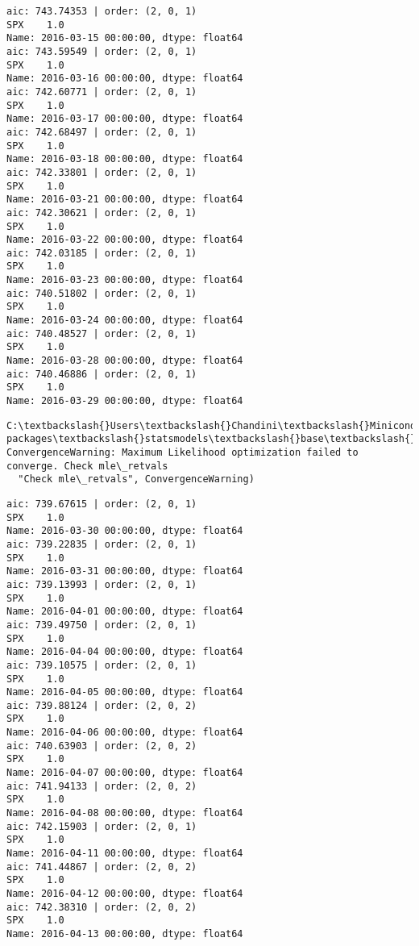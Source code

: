 \documentclass[11pt]{article}
\begin{document}
    \begin{Verbatim}[commandchars=\\\{\}]
aic: 743.74353 | order: (2, 0, 1)
SPX    1.0
Name: 2016-03-15 00:00:00, dtype: float64
aic: 743.59549 | order: (2, 0, 1)
SPX    1.0
Name: 2016-03-16 00:00:00, dtype: float64
aic: 742.60771 | order: (2, 0, 1)
SPX    1.0
Name: 2016-03-17 00:00:00, dtype: float64
aic: 742.68497 | order: (2, 0, 1)
SPX    1.0
Name: 2016-03-18 00:00:00, dtype: float64
aic: 742.33801 | order: (2, 0, 1)
SPX    1.0
Name: 2016-03-21 00:00:00, dtype: float64
aic: 742.30621 | order: (2, 0, 1)
SPX    1.0
Name: 2016-03-22 00:00:00, dtype: float64
aic: 742.03185 | order: (2, 0, 1)
SPX    1.0
Name: 2016-03-23 00:00:00, dtype: float64
aic: 740.51802 | order: (2, 0, 1)
SPX    1.0
Name: 2016-03-24 00:00:00, dtype: float64
aic: 740.48527 | order: (2, 0, 1)
SPX    1.0
Name: 2016-03-28 00:00:00, dtype: float64
aic: 740.46886 | order: (2, 0, 1)
SPX    1.0
Name: 2016-03-29 00:00:00, dtype: float64

    \end{Verbatim}

    \begin{Verbatim}[commandchars=\\\{\}]
C:\textbackslash{}Users\textbackslash{}Chandini\textbackslash{}Miniconda3\textbackslash{}envs\textbackslash{}auquan\textbackslash{}lib\textbackslash{}site-packages\textbackslash{}statsmodels\textbackslash{}base\textbackslash{}model.py:496: ConvergenceWarning: Maximum Likelihood optimization failed to converge. Check mle\_retvals
  "Check mle\_retvals", ConvergenceWarning)

    \end{Verbatim}

    \begin{Verbatim}[commandchars=\\\{\}]
aic: 739.67615 | order: (2, 0, 1)
SPX    1.0
Name: 2016-03-30 00:00:00, dtype: float64
aic: 739.22835 | order: (2, 0, 1)
SPX    1.0
Name: 2016-03-31 00:00:00, dtype: float64
aic: 739.13993 | order: (2, 0, 1)
SPX    1.0
Name: 2016-04-01 00:00:00, dtype: float64
aic: 739.49750 | order: (2, 0, 1)
SPX    1.0
Name: 2016-04-04 00:00:00, dtype: float64
aic: 739.10575 | order: (2, 0, 1)
SPX    1.0
Name: 2016-04-05 00:00:00, dtype: float64
aic: 739.88124 | order: (2, 0, 2)
SPX    1.0
Name: 2016-04-06 00:00:00, dtype: float64
aic: 740.63903 | order: (2, 0, 2)
SPX    1.0
Name: 2016-04-07 00:00:00, dtype: float64
aic: 741.94133 | order: (2, 0, 2)
SPX    1.0
Name: 2016-04-08 00:00:00, dtype: float64
aic: 742.15903 | order: (2, 0, 1)
SPX    1.0
Name: 2016-04-11 00:00:00, dtype: float64
aic: 741.44867 | order: (2, 0, 2)
SPX    1.0
Name: 2016-04-12 00:00:00, dtype: float64
aic: 742.38310 | order: (2, 0, 2)
SPX    1.0
Name: 2016-04-13 00:00:00, dtype: float64

    \end{Verbatim}
\end{document}
